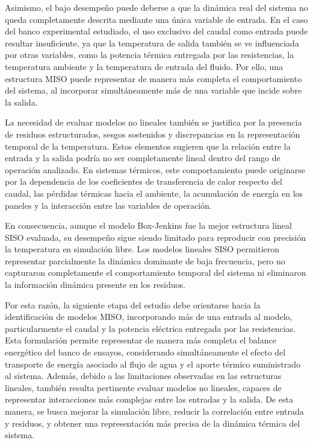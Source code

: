 \documentclass[11pt]{report}
\begin{document}
Asimismo, el bajo desempeño puede deberse a que la dinámica real del sistema no queda completamente descrita mediante una única variable de entrada. En el caso del banco experimental estudiado, el uso exclusivo del caudal como entrada puede resultar insuficiente, ya que la temperatura de salida también se ve influenciada por otras variables, como la potencia térmica entregada por las resistencias, la temperatura ambiente y la temperatura de entrada del fluido. Por ello, una estructura MISO puede representar de manera más completa el comportamiento del sistema, al incorporar simultáneamente más de una variable que incide sobre la salida.

La necesidad de evaluar modelos no lineales también se justifica por la presencia de residuos estructurados, sesgos sostenidos y discrepancias en la representación temporal de la temperatura. Estos elementos sugieren que la relación entre la entrada y la salida podría no ser completamente lineal dentro del rango de operación analizado. En sistemas térmicos, este comportamiento puede originarse por la dependencia de los coeficientes de transferencia de calor respecto del caudal, las pérdidas térmicas hacia el ambiente, la acumulación de energía en los paneles y la interacción entre las variables de operación.

En consecuencia, aunque el modelo Box-Jenkins fue la mejor estructura lineal SISO evaluada, su desempeño sigue siendo limitado para reproducir con precisión la temperatura en simulación libre. Los modelos lineales SISO permitieron representar parcialmente la dinámica dominante de baja frecuencia, pero no capturaron completamente el comportamiento temporal del sistema ni eliminaron la información dinámica presente en los residuos.

Por esta razón, la siguiente etapa del estudio debe orientarse hacia la identificación de modelos MISO, incorporando más de una entrada al modelo, particularmente el caudal y la potencia eléctrica entregada por las resistencias. Esta formulación permite representar de manera más completa el balance energético del banco de ensayos, considerando simultáneamente el efecto del transporte de energía asociado al flujo de agua y el aporte térmico suministrado al sistema. Además, debido a las limitaciones observadas en las estructuras lineales, también resulta pertinente evaluar modelos no lineales, capaces de representar interacciones más complejas entre las entradas y la salida. De esta manera, se busca mejorar la simulación libre, reducir la correlación entre entrada y residuos, y obtener una representación más precisa de la dinámica térmica del sistema.
\end{document}

